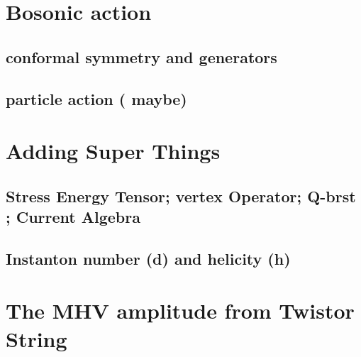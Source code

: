 



\section{Bosonic action}

\subsection{conformal symmetry and generators}

\subsection{ particle action ( maybe)}

\section{Adding Super Things}

\subsection{Stress Energy Tensor; vertex Operator; Q-brst ; Current Algebra}

\subsection{Instanton number (d) and helicity (h)}


\section{The MHV amplitude from Twistor String }


